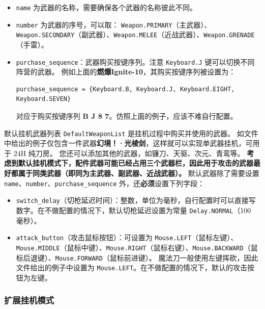 \begin{itemize}
\item \lstinline{name} 为武器的名称，需要确保各个武器的名称彼此不同。
\item \lstinline{number} 为武器的序号，可以取：
\lstinline{Weapon.PRIMARY}（主武器）、\lstinline{Weapon.SECONDARY}（副武器）、\lstinline{Weapon.MELEE}（近战武器）、\lstinline{Weapon.GRENADE}（手雷）。
\item \lstinline{purchase_sequence}：武器购买按键序列。注意 \lstinline{Keyboard.J} 键可以切换不同阵营的武器。
例如上面的\textbf{\color{red}燃爆Ignite-10}，其购买按键序列被设置为：

\begin{verbatim}
purchase_sequence = {Keyboard.B, Keyboard.J, Keyboard.EIGHT, Keyboard.SEVEN}
\end{verbatim}

对应于购买按键序列 \textbf{\color{red}B J 8 7}。仿照上面的例子，应该不难自行配置。
\end{itemize}

默认挂机武器列表 \lstinline{DefaultWeaponList} 是挂机过程中购买并使用的武器。
如文件中给出的例子仅包含一件武器\textbf{\color{red}幻境！·光棱剑}，这样就可以实现单武器挂机，可用于 24H 纯刀房。
您还可以添加其他的武器，如镰刀、天驱、次元、青鸾等。
\textbf{\color{red} 考虑到默认挂机模式下，配件武器可能已经占用三个武器栏，因此用于攻击的武器最好都属于同类武器（即同为主武器、副武器、近战武器）。}
默认武器除了需要设置 \lstinline{name}、\lstinline{number}、\lstinline{purchase_sequence} 外，还\textbf{\color{red}必须}设置下列字段：

\begin{itemize}
\item \lstinline{switch_delay}（切枪延迟时间）：整数，单位为毫秒，自行配置时可以直接写数字。在不做配置的情况下，默认切枪延迟设置为常量 \lstinline{Delay.NORMAL}（100 毫秒）。
\item \lstinline{attack_button}（攻击鼠标按钮）：可设置为 \lstinline{Mouse.LEFT}（鼠标左键）、\lstinline{Mouse.MIDDLE}（鼠标中键）、\lstinline{Mouse.RIGHT}（鼠标右键）、\lstinline{Mouse.BACKWARD}（鼠标后退键）、\lstinline{Mouse.FORWARD}（鼠标前进键）。
魔法刀一般使用左键挥砍，因此文件给出的例子中设置为 \lstinline{Mouse.LEFT}。在不做配置的情况下，默认的攻击按钮为左键。
\end{itemize}

\subsubsection{扩展挂机模式}

